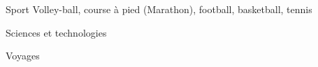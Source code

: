 

\begin{cvskills}

  \cvskill
    {Sport} %
    {Volley-ball, course à pied (Marathon), football, basketball, tennis} %

\cvskill
{Sciences et technologies} %
{} %

\cvskill
{Voyages} %
{} %


\end{cvskills}
